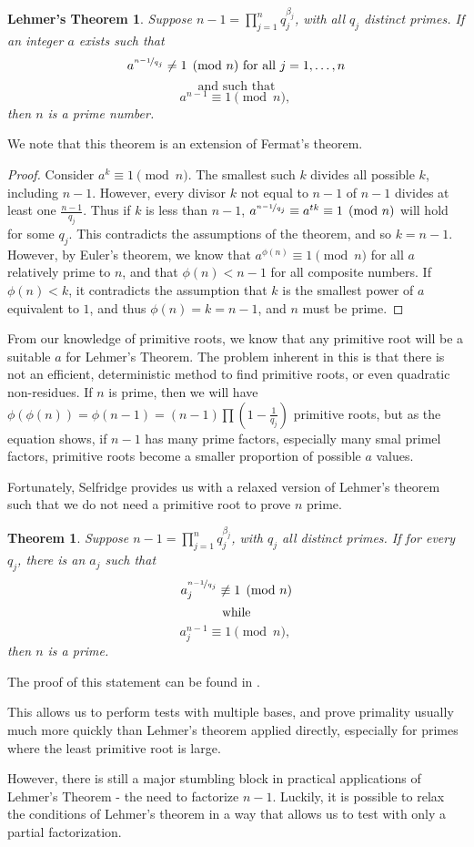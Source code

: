 \documentclass{article}
\newtheorem*{theorem}{Theorem}
\begin{document}
\newtheorem*{lehmer}{Lehmer's Theorem}
\begin{lehmer}
Suppose $n-1 = \prod^n_{j=1} q_j^{\beta_j}$, with all $q_j$ distinct primes. If an integer $a$ exists such that 
	$$a^{\nicefrac{n-1}{q_j}} \neq 1 \pmod n \text{ for all } j = 1, \ldots, n$$
	$$\text { and such that }$$
	$$a^{n-1} \equiv 1\pmod n \text{, }$$
then $n$ is a prime number.
\end{lehmer}
We note that this theorem is an extension of Fermat's theorem. 
\begin{proof}
Consider $a^k \equiv 1 \pmod n$. The smallest such $k$ divides all possible $k$, including $n-1$. However, every divisor $k$ not equal to $n-1$ of $n-1$ divides at least one $\frac{n-1}{q_j}$. Thus if $k$ is  less than $n-1$,  $a^{\nicefrac{n-1}{q_j}} \equiv a^{tk}\equiv 1 \pmod n$ will hold for some $q_j$. This contradicts the assumptions of the theorem, and so $k = n-1$. However, by Euler's theorem, we know that $a^{\phi(n)} \equiv 1 \pmod n$ for all $a$ relatively prime to $n$, and that $\phi(n) < n-1$ for all composite numbers. If $\phi(n) < k$, it contradicts the assumption that $k$ is the smallest power of $a$ equivalent to $1$, and thus $\phi(n) = k = n-1$, and $n$ must be prime.
\end{proof}

\par From our knowledge of primitive roots, we know that any primitive root will be a suitable $a$ for Lehmer's Theorem. The problem inherent in this is that there is not an efficient, deterministic method to find primitive roots, or even quadratic non-residues. If $n$ is prime, then we will have $\phi(\phi(n)) = \phi(n-1) = (n-1) \prod (1- \frac{1}{q_j})$ primitive roots, but as the equation shows, if $n-1$ has many prime factors, especially many smal primel factors, primitive roots become a smaller proportion of possible $a$ values.

 \par Fortunately, Selfridge provides us with a relaxed version of Lehmer's theorem such that we do not need a primitive root to prove $n$ prime.
\begin{theorem}
Suppose $n-1 = \prod^n_{j=1} q_j^{\beta_j}$, with $q_j$ all distinct primes.  If for every $q_j$, there is an $a_j$ such that
	$$a_j^{\nicefrac{n-1}{q_j}} \not\equiv 1 \pmod n$$ 
	$$\textnormal{ while }$$
	$$a_j^{n-1} \equiv 1 \pmod n \text{, }$$
then $n$ is a prime.
\end{theorem}
The proof of this statement can be found in \citep{selfridge}.
\par This allows us to perform tests with multiple bases, and prove primality usually much more quickly than Lehmer's theorem applied directly, especially for primes where the least primitive root is large.
\par However, there is still a major stumbling block in practical applications of Lehmer's Theorem - the need to factorize $n -1$. Luckily, it is possible to relax the conditions of Lehmer's theorem in a way that allows us to test with only a partial factorization.
\end{document}
